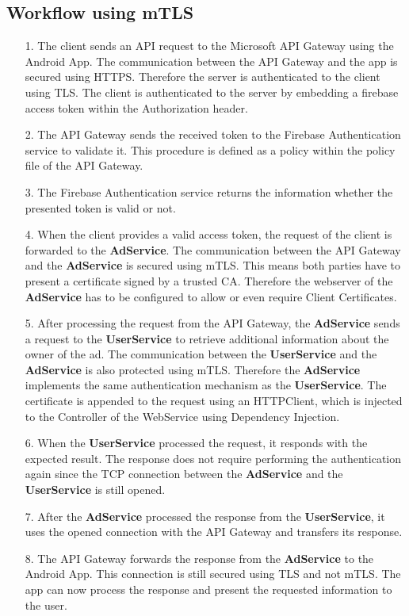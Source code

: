 \subsection{Workflow using mTLS}
\begin{enumerate}
	\item[1.] The client sends an API request to the Microsoft API Gateway using the Android App.
		The communication between the API Gateway and the app is secured using HTTPS.
		Therefore the server is authenticated to the client using TLS.
		The client is authenticated to the server by embedding a firebase access token within the Authorization header.
	\item[2.] The API Gateway sends the received token to the Firebase Authentication service to validate it.
		This procedure is defined as a policy within the policy file of the API Gateway.
		\\
	\item[3.] The Firebase Authentication service returns the information whether the presented token is valid or not.
	\item[4.] When the client provides a valid access token, the request of the client is forwarded to the \textbf{AdService}.
		The communication between the API Gateway and the \textbf{AdService} is secured using mTLS.
		This means both parties have to present a certificate signed by a trusted CA.
		Therefore the webserver of the \textbf{AdService} has to be configured to allow or even require Client Certificates.
	\item[5.] After processing the request from the API Gateway, the \textbf{AdService} sends a request to the \textbf{UserService} to retrieve additional information about the owner of the ad.
		The communication between the \textbf{UserService} and the \textbf{AdService} is also protected using mTLS.
		Therefore the \textbf{AdService} implements the same authentication mechanism as the \textbf{UserService}.
		The certificate is appended to the request using an HTTPClient, which is injected to the Controller of the WebService using Dependency Injection.
	\item[6.] When the \textbf{UserService} processed the request, it responds with the expected result.
		The response does not require performing the authentication again since the TCP connection between the \textbf{AdService} and the \textbf{UserService} is still opened.
	\item[7.] After the \textbf{AdService} processed the response from the \textbf{UserService}, it uses the opened connection with the API Gateway and transfers its response.
	\item[8.] The API Gateway forwards the response from the \textbf{AdService} to the Android App.
		This connection is still secured using TLS and not mTLS.
		The app can now process the response and present the requested information to the user.
\end{enumerate}

